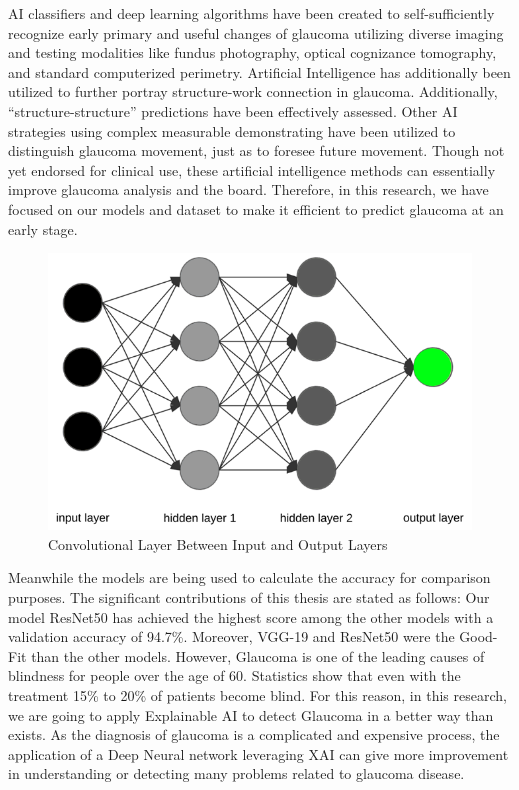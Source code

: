 \documentclass[conference]{IEEEtran}
\begin{document}
AI classifiers and deep learning algorithms have been created to self-sufficiently recognize early primary and useful changes of glaucoma utilizing diverse imaging and testing modalities like fundus photography, optical cognizance tomography, and standard computerized perimetry. Artificial Intelligence has additionally been utilized to further portray structure-work connection in glaucoma. Additionally, “structure-structure” predictions have been effectively assessed. Other AI strategies using complex measurable demonstrating have been utilized to distinguish glaucoma movement, just as to foresee future movement. Though not yet endorsed for clinical use, these artificial intelligence methods can essentially improve glaucoma analysis and the board. Therefore, in this research, we have focused on our models and dataset to make it efficient to predict glaucoma at an early stage. 

\begin{figure}[hbt!]
\centerline{\includegraphics[scale=0.3]{intro.png}}
\caption{Convolutional Layer Between Input and Output Layers}
\label{fig}
\end{figure}

\noindent Meanwhile the models are being used to calculate the accuracy for comparison purposes. The significant contributions of this thesis are stated as follows:  Our model ResNet50 has achieved the highest score among the other models with a validation accuracy of 94.7\%. Moreover, VGG-19 and ResNet50 were the Good-Fit than the other models. However, Glaucoma is one of the leading causes of blindness for people over the age of 60. Statistics show that even with the treatment 15\% to 20\% of patients become blind. For this reason, in this research, we are going to apply Explainable AI to detect Glaucoma in a better way than exists. As the diagnosis of glaucoma is a complicated and expensive process, the application of a Deep Neural network leveraging XAI can give more improvement in understanding or detecting many problems related to glaucoma disease.
\end{document}
